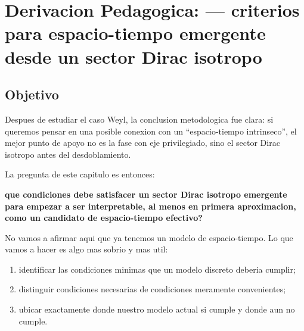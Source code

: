 \chapter{Derivacion Pedagogica: --- criterios para espacio-tiempo emergente desde un sector Dirac isotropo}
\label{ch:criterios-espacio-tiempo-emergente}



\section{Objetivo}
Despues de estudiar el caso Weyl, la conclusion metodologica fue clara: si queremos pensar en una posible conexion con un \enquote{espacio-tiempo intrinseco}, el mejor punto de apoyo no es la fase con eje privilegiado, sino el sector Dirac isotropo antes del desdoblamiento.

La pregunta de este capitulo es entonces:
\begin{displayquote}
\textbf{que condiciones debe satisfacer un sector Dirac isotropo emergente para empezar a ser interpretable, al menos en primera aproximacion, como un candidato de espacio-tiempo efectivo?}
\end{displayquote}

No vamos a afirmar aqui que ya tenemos un modelo de espacio-tiempo. Lo que vamos a hacer es algo mas sobrio y mas util:
\begin{enumerate}[label=\arabic*.]
    \item identificar las condiciones minimas que un modelo discreto deberia cumplir;
    \item distinguir condiciones necesarias de condiciones meramente convenientes;
    \item ubicar exactamente donde nuestro modelo actual si cumple y donde aun no cumple.
\end{enumerate}

